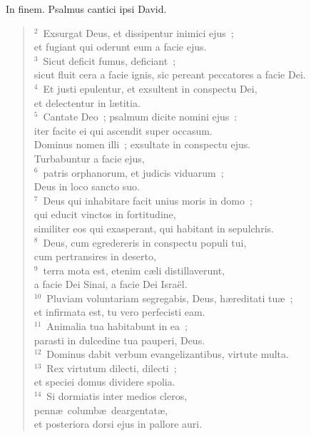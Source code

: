 \bchapter
\lettrine[lines=3,image=true,loversize=0.05,lraise=-0.03]{I}{}n finem. Psalmus cantici ipsi David.
\begin{flushleft}\begin{verse}\vspace{6pt}${}^{2}$~Exsurgat Deus, et dissipentur inimici ejus~;\\ et fugiant qui oderunt eum a facie ejus.\\
${}^{3}$~Sicut deficit fumus, deficiant~;\\ sicut fluit cera a facie ignis, sic pereant peccatores a facie Dei.\\
${}^{4}$~Et justi epulentur, et exsultent in conspectu Dei,\\ et delectentur in l\ae titia.\\
${}^{5}$~Cantate Deo~; psalmum dicite nomini ejus~:\\ iter facite ei qui ascendit super occasum.\\ Dominus nomen illi~; exsultate in conspectu ejus.\\ Turbabuntur a facie ejus,\\
${}^{6}$~patris orphanorum, et judicis viduarum~;\\ Deus in loco sancto suo.\\
${}^{7}$~Deus qui inhabitare facit unius moris in domo~;\\ qui educit vinctos in fortitudine,\\ similiter eos qui exasperant, qui habitant in sepulchris.\\
${}^{8}$~Deus, cum egredereris in conspectu populi tui,\\ cum pertransires in deserto,\\
${}^{9}$~terra mota est, etenim c\ae li distillaverunt,\\ a facie Dei Sinai, a facie Dei Isra\"el.\\
${}^{10}$~Pluviam voluntariam segregabis, Deus, h\ae reditati tu\ae~;\\ et infirmata est, tu vero perfecisti eam.\\
${}^{11}$~Animalia tua habitabunt in ea~;\\ parasti in dulcedine tua pauperi, Deus.\\
${}^{12}$~Dominus dabit verbum evangelizantibus, virtute multa.\\
${}^{13}$~Rex virtutum dilecti, dilecti~;\\ et speciei domus dividere spolia.\\
${}^{14}$~Si dormiatis inter medios cleros,\\ penn\ae\ columb\ae\ deargentat\ae ,\\ et posteriora dorsi ejus in pallore auri.\\

\end{verse}
\end{flushleft}
